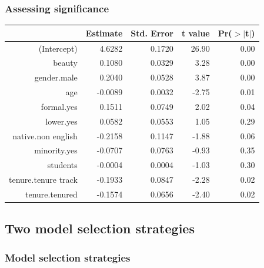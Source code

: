 \begin{frame}
\frametitle{Assessing significance}


{\scriptsize
\begin{center}
\begin{tabular}{rrrrr}
  \hline
 & Estimate & Std. Error & t value & Pr($>$$|$t$|$) \\ 
  \hline
(Intercept) & 4.6282 & 0.1720 & 26.90 & 0.00 \\ 
  beauty & 0.1080 & 0.0329 & 3.28 & 0.00 \\ 
  gender.male & 0.2040 & 0.0528 & 3.87 & 0.00 \\ 
  age & -0.0089 & 0.0032 & -2.75 & 0.01 \\ 
  formal.yes & 0.1511 & 0.0749 & 2.02 & 0.04 \\ 
  \rowcolor{oiB!50}
  lower.yes & 0.0582 & 0.0553 & 1.05 & 0.29 \\ 
    \rowcolor{oiB!50}
  native.non english & -0.2158 & 0.1147 & -1.88 & 0.06 \\ 
    \rowcolor{oiB!50}
  minority.yes & -0.0707 & 0.0763 & -0.93 & 0.35 \\ 
    \rowcolor{oiB!50}
  students & -0.0004 & 0.0004 & -1.03 & 0.30 \\ 
  tenure.tenure track & -0.1933 & 0.0847 & -2.28 & 0.02 \\ 
  tenure.tenured & -0.1574 & 0.0656 & -2.40 & 0.02 \\ 
   \hline
\end{tabular}
\end{center}
}

\end{frame}


\subsection{Two model selection strategies}


\begin{frame}
\frametitle{Model selection strategies}


\end{frame}


